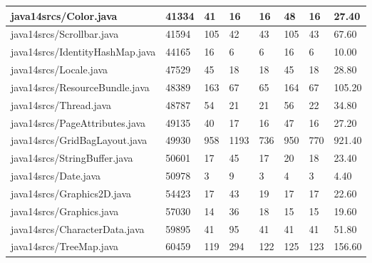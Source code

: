 \begin{tabular}{|l|l|l|l|l|l|l|l|}
\hline
java14srcs/Color.java                              & 41334       & 41        & 16        & 16        & 48        & 16        & 27.40     \\
\hline
java14srcs/Scrollbar.java                          & 41594       & 105       & 42        & 43        & 105       & 43        & 67.60     \\
\hline
java14srcs/IdentityHashMap.java                    & 44165       & 16        & 6         & 6         & 16        & 6         & 10.00     \\
\hline
java14srcs/Locale.java                             & 47529       & 45        & 18        & 18        & 45        & 18        & 28.80     \\
\hline
java14srcs/ResourceBundle.java                     & 48389       & 163       & 67        & 65        & 164       & 67        & 105.20    \\
\hline
java14srcs/Thread.java                             & 48787       & 54        & 21        & 21        & 56        & 22        & 34.80     \\
\hline
java14srcs/PageAttributes.java                     & 49135       & 40        & 17        & 16        & 47        & 16        & 27.20     \\
\hline
java14srcs/GridBagLayout.java                      & 49930       & 958       & 1193      & 736       & 950       & 770       & 921.40    \\
\hline
java14srcs/StringBuffer.java                       & 50601       & 17        & 45        & 17        & 20        & 18        & 23.40     \\
\hline
java14srcs/Date.java                               & 50978       & 3         & 9         & 3         & 4         & 3         & 4.40      \\
\hline
java14srcs/Graphics2D.java                         & 54423       & 17        & 43        & 19        & 17        & 17        & 22.60     \\
\hline
java14srcs/Graphics.java                           & 57030       & 14        & 36        & 18        & 15        & 15        & 19.60     \\
\hline
java14srcs/CharacterData.java                      & 59895       & 41        & 95        & 41        & 41        & 41        & 51.80     \\
\hline
java14srcs/TreeMap.java                            & 60459       & 119       & 294       & 122       & 125       & 123       & 156.60    \\

\end{tabular}
